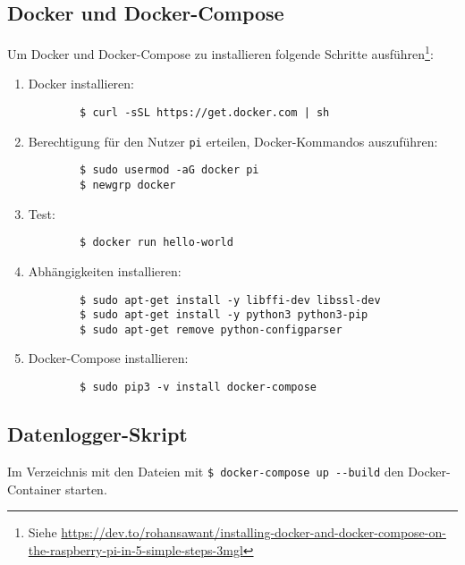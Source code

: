 \subsection{Docker und Docker-Compose}
Um Docker und Docker-Compose zu installieren folgende Schritte ausführen\footnote{Siehe \href{https://dev.to/rohansawant/installing-docker-and-docker-compose-on-the-raspberry-pi-in-5-simple-steps-3mgl}{https://dev.to/rohansawant/installing-docker-and-docker-compose-on-the-raspberry-pi-in-5-simple-steps-3mgl}}:
\begin{enumerate}
	\item Docker installieren:
	\begin{verbatim}
		$ curl -sSL https://get.docker.com | sh
	\end{verbatim}
	\item Berechtigung für den Nutzer \texttt{pi} erteilen, Docker-Kommandos auszuführen:
	\begin{verbatim}
		$ sudo usermod -aG docker pi
		$ newgrp docker
	\end{verbatim}
	\item Test:
	\begin{verbatim}
		$ docker run hello-world
	\end{verbatim}
	\item Abhängigkeiten installieren:
	\begin{verbatim}
		$ sudo apt-get install -y libffi-dev libssl-dev
		$ sudo apt-get install -y python3 python3-pip
		$ sudo apt-get remove python-configparser
	\end{verbatim}
	\item Docker-Compose installieren:
	\begin{verbatim}
		$ sudo pip3 -v install docker-compose
	\end{verbatim}

\end{enumerate}

\subsection{Datenlogger-Skript}
Im Verzeichnis mit den Dateien mit \verb|$ docker-compose up --build| den Docker-Container starten.

